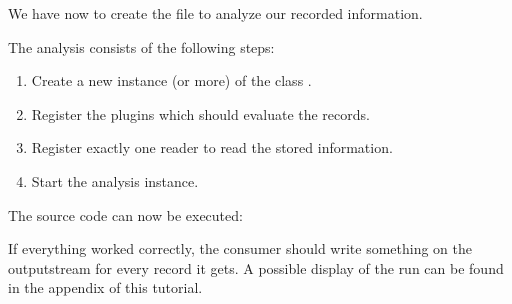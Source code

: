 \setJavaCodeListing       


We have now to create the file  to analyze our recorded information.

\setJavaCodeListing       

\notify The analysis consists of the following steps:
\begin{enumerate}
\item Create a new instance (or more) of the class .
\item Register the plugins which should evaluate the records.
\item Register exactly one reader to read the stored information.
\item Start the analysis instance.
\end{enumerate}
The source code can now be executed:

\setBashListing 		
		

If everything worked correctly, the consumer should write something on the outputstream for every record it gets. A possible display of the run can be found in the appendix of this tutorial. 
